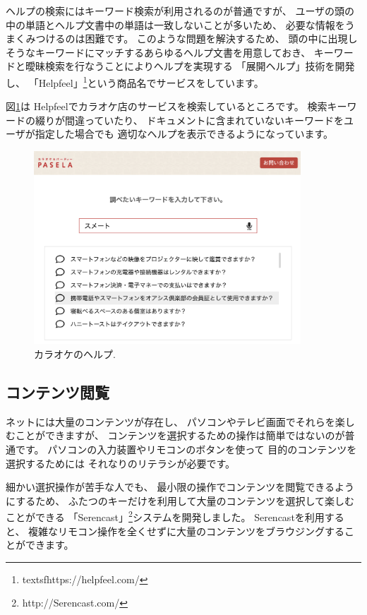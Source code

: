 \documentclass[topics]{compsoft} %
\begin{document}
ヘルプの検索にはキーワード検索が利用されるのが普通ですが、
ユーザの頭の中の単語とヘルプ文書中の単語は一致しないことが多いため、
必要な情報をうまくみつけるのは困難です\cite{10.1145/32206.32212}。
%
このような問題を解決するため、
頭の中に出現しそうなキーワードにマッチするあらゆるヘルプ文書を用意しておき、
キーワードと曖昧検索を行なうことによりヘルプを実現する
「展開ヘルプ」\cite{ExpandHelp}技術を開発し、
「Helpfeel」\footnote{
  textsf{https:{\slash}{\slash}helpfeel.com{\slash}}
}という商品名でサービスをしています。

図\ref{helpinquiry}は
Helpfeelでカラオケ店のサービスを検索しているところです。
検索キーワードの綴りが間違っていたり、
ドキュメントに含まれていないキーワードをユーザが指定した場合でも
適切なヘルプを表示できるようになっています。

\begin{figure}[t]
  \includegraphics[width=10cm,bb=0 0 1640 1188]{figures/4b2ca6d18537ec8d6922e0389324c3ea.png}
  \caption{カラオケのヘルプ.}
  \label{helpinquiry}
\end{figure}

\subsection{コンテンツ閲覧}

ネットには大量のコンテンツが存在し、
パソコンやテレビ画面でそれらを楽しむことができますが、
コンテンツを選択するための操作は簡単ではないのが普通です。
パソコンの入力装置やリモコンのボタンを使って
目的のコンテンツを選択するためには
それなりのリテラシが必要です。

細かい選択操作が苦手な人でも、
最小限の操作でコンテンツを閲覧できるようにするため、
ふたつのキーだけを利用して大量のコンテンツを選択して楽しむことができる
「Serencast」\footnote{
  \textsf{http:{\slash}{\slash}Serencast.com{\slash}}
}システムを開発しました\cite{Serencast}。
Serencastを利用すると、
複雑なリモコン操作を全くせずに大量のコンテンツをブラウジングすることができます。
\end{document}
